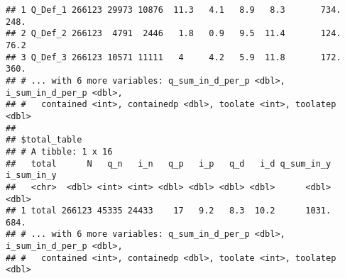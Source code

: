 \documentclass[
]{article}
\begin{document}
\begin{verbatim}
## 1 Q_Def_1 266123 29973 10876  11.3   4.1   8.9   8.3       734.      248. 
## 2 Q_Def_2 266123  4791  2446   1.8   0.9   9.5  11.4       124.       76.2
## 3 Q_Def_3 266123 10571 11111   4     4.2   5.9  11.8       172.      360. 
## # ... with 6 more variables: q_sum_in_d_per_p <dbl>, i_sum_in_d_per_p <dbl>,
## #   contained <int>, containedp <dbl>, toolate <int>, toolatep <dbl>
## 
## $total_table
## # A tibble: 1 x 16
##   total      N   q_n   i_n   q_p   i_p   q_d   i_d q_sum_in_y i_sum_in_y
##   <chr>  <dbl> <int> <int> <dbl> <dbl> <dbl> <dbl>      <dbl>      <dbl>
## 1 total 266123 45335 24433    17   9.2   8.3  10.2      1031.       684.
## # ... with 6 more variables: q_sum_in_d_per_p <dbl>, i_sum_in_d_per_p <dbl>,
## #   contained <int>, containedp <dbl>, toolate <int>, toolatep <dbl>
\end{verbatim}
\end{document}
